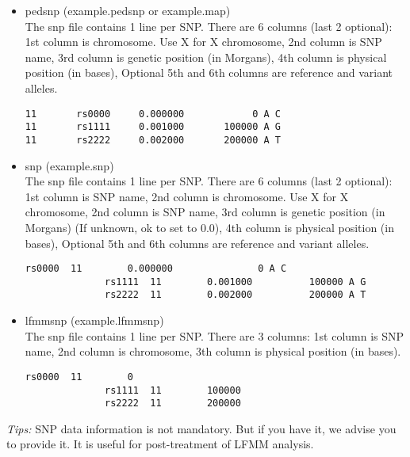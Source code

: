 \documentclass[10pt,a4paper]{article}
\begin{document}
\begin{itemize}
\item pedsnp (example.pedsnp or example.map) \\
The snp file contains 1 line per SNP.  There are 6 columns (last 2 optional):
  1st column is chromosome.  Use X for X chromosome,
  2nd column is SNP name,
  3rd column is genetic position (in Morgans),
  4th column is physical position (in bases),
  Optional 5th and 6th columns are reference and variant alleles.

\begin{center}
\footnotesize
\begin{Verbatim}[frame=single]
11       rs0000     0.000000            0 A C
11       rs1111     0.001000       100000 A G
11       rs2222     0.002000       200000 A T
\end{Verbatim}
\end{center}

\item snp (example.snp) \\
The snp file contains 1 line per SNP.  There are 6 columns (last 2 optional):
  1st column is SNP name,
  2nd column is chromosome.  Use X for X chromosome,
  2nd column is SNP name,
  3rd column is genetic position (in Morgans)  (If unknown, ok to set to 0.0),
  4th column is physical position (in bases),
  Optional 5th and 6th columns are reference and variant alleles.
\begin{center}
\footnotesize
\begin{Verbatim}[frame=single]
              rs0000  11        0.000000               0 A C
              rs1111  11        0.001000          100000 A G
              rs2222  11        0.002000          200000 A T
\end{Verbatim}
\end{center}

\item lfmmsnp (example.lfmmsnp) \\
The snp file contains 1 line per SNP.  There are 3 columns:
  1st column is SNP name,
  2nd column is chromosome,
  3th column is physical position (in bases).
\begin{center}
\footnotesize
\begin{Verbatim}[frame=single]
              rs0000  11        0
              rs1111  11        100000
              rs2222  11        200000
\end{Verbatim}
\end{center}
\end{itemize}
\noindent
{\it Tips:} SNP data information is not mandatory. But if you have it, we advise you to provide it.
It is useful for post-treatment of LFMM analysis.
\end{document}
